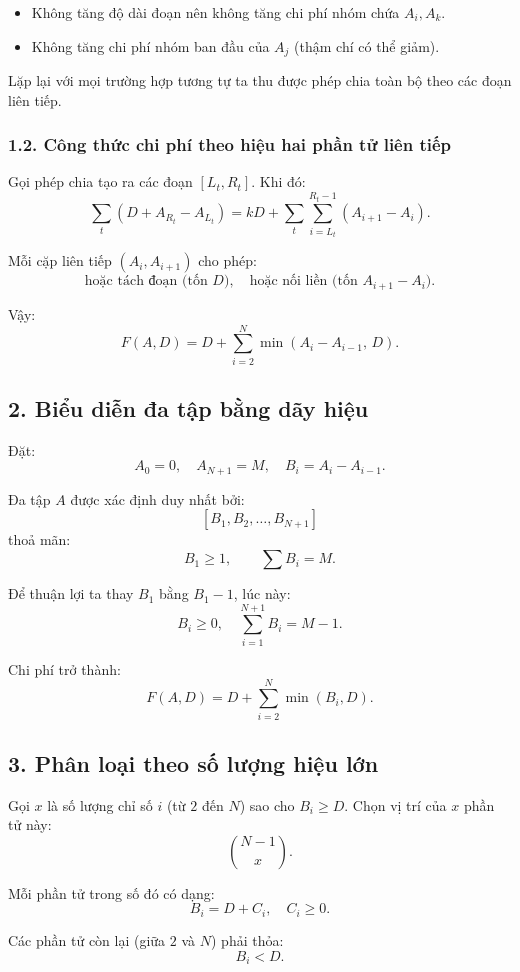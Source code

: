 \begin{itemize}
    \item Không tăng độ dài đoạn nên không tăng chi phí nhóm chứa $A_i, A_k$.
    \item Không tăng chi phí nhóm ban đầu của $A_j$ (thậm chí có thể giảm).
\end{itemize}

Lặp lại với mọi trường hợp tương tự ta thu được phép chia toàn bộ theo các đoạn liên tiếp.

\subsubsection*{1.2. Công thức chi phí theo hiệu hai phần tử liên tiếp}

Gọi phép chia tạo ra các đoạn $[L_t, R_t]$. Khi đó:
\[
\sum_t \left( D + A_{R_t} - A_{L_t} \right)
= kD + \sum_t \sum_{i=L_t}^{R_t-1} (A_{i+1}-A_i).
\]

Mỗi cặp liên tiếp $(A_i, A_{i+1})$ cho phép:
\[
\text{hoặc tách đoạn (tốn } D),\quad \text{hoặc nối liền (tốn } A_{i+1}-A_i).
\]

Vậy:
\[
F(A,D)
= D + \sum_{i=2}^N \min(A_i - A_{i-1},\, D).
\]

\subsection*{2. Biểu diễn đa tập bằng dãy hiệu}

Đặt:
\[
A_0 = 0,\quad A_{N+1} = M,\quad B_i = A_i - A_{i-1}.
\]

Đa tập $A$ được xác định duy nhất bởi:
\[
[B_1, B_2, \dots, B_{N+1}]
\]
thoả mãn:
\[
B_1 \ge 1,\qquad \sum B_i = M.
\]

Để thuận lợi ta thay $B_1$ bằng $B_1 - 1$, lúc này:
\[
B_i \ge 0,\quad \sum_{i=1}^{N+1} B_i = M - 1.
\]

Chi phí trở thành:
\[
F(A,D)
= D + \sum_{i=2}^N \min(B_i, D).
\]

\subsection*{3. Phân loại theo số lượng hiệu lớn}

Gọi $x$ là số lượng chỉ số $i$ (từ $2$ đến $N$) sao cho $B_i \ge D$.  
Chọn vị trí của $x$ phần tử này:
\[
\binom{N-1}{x}.
\]

Mỗi phần tử trong số đó có dạng:
\[
B_i = D + C_i,\quad C_i \ge 0.
\]

Các phần tử còn lại (giữa $2$ và $N$) phải thỏa:
\[
B_i < D.
\]

